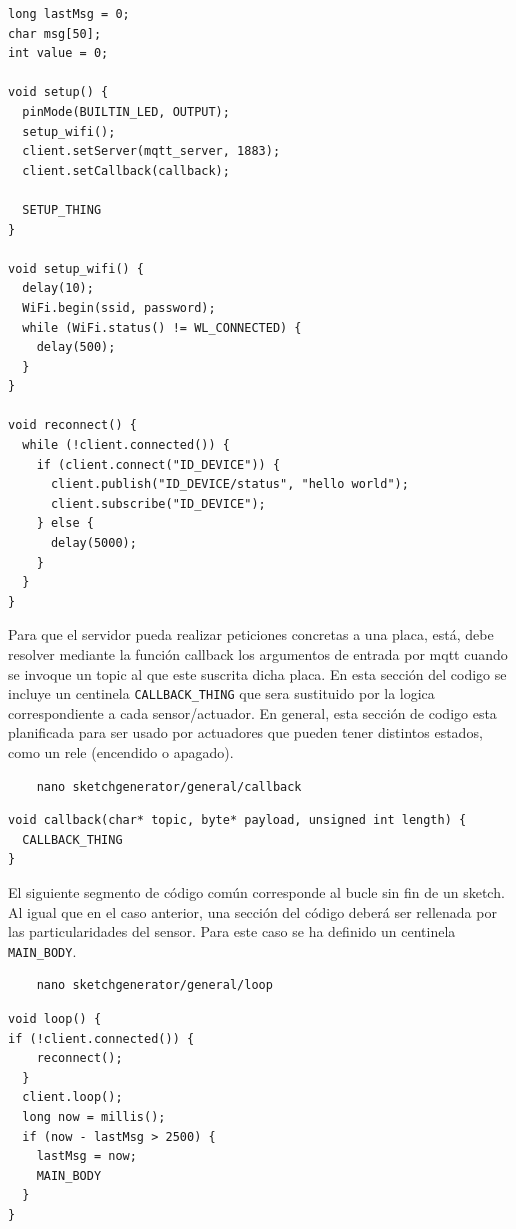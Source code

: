 \begin{verbatim}
long lastMsg = 0;
char msg[50];
int value = 0;

void setup() {
  pinMode(BUILTIN_LED, OUTPUT);
  setup_wifi();
  client.setServer(mqtt_server, 1883);
  client.setCallback(callback);

  SETUP_THING
}

void setup_wifi() {
  delay(10);
  WiFi.begin(ssid, password);
  while (WiFi.status() != WL_CONNECTED) {
    delay(500);
  }
}

void reconnect() {
  while (!client.connected()) {
    if (client.connect("ID_DEVICE")) {
      client.publish("ID_DEVICE/status", "hello world");
      client.subscribe("ID_DEVICE");
    } else {
      delay(5000);
    }
  }
}
\end{verbatim}

Para que el servidor pueda realizar peticiones concretas a una placa, está, debe resolver mediante la función callback los argumentos de entrada por \gls{mqtt} cuando se invoque un topic al que este suscrita dicha placa. En esta sección del codigo se incluye un centinela \verb|CALLBACK_THING| que sera sustituido por la logica correspondiente a cada sensor/actuador. En general, esta sección de codigo esta planificada para ser usado por actuadores que pueden tener distintos estados, como un rele (encendido o apagado).

\begin{verbatim}
    nano sketchgenerator/general/callback
\end{verbatim}

\begin{verbatim}
void callback(char* topic, byte* payload, unsigned int length) {
  CALLBACK_THING
}
\end{verbatim}


El siguiente segmento de código común corresponde al bucle sin fin de un \gls{sketch}. Al igual que en el caso anterior, una sección del código deberá ser rellenada por las particularidades del sensor. Para este caso se ha definido un centinela \verb|MAIN_BODY|.

\begin{verbatim}
    nano sketchgenerator/general/loop
\end{verbatim}

\begin{verbatim}
void loop() {
if (!client.connected()) {
    reconnect();
  }
  client.loop();
  long now = millis();
  if (now - lastMsg > 2500) {
    lastMsg = now;
    MAIN_BODY
  }
}
\end{verbatim}

